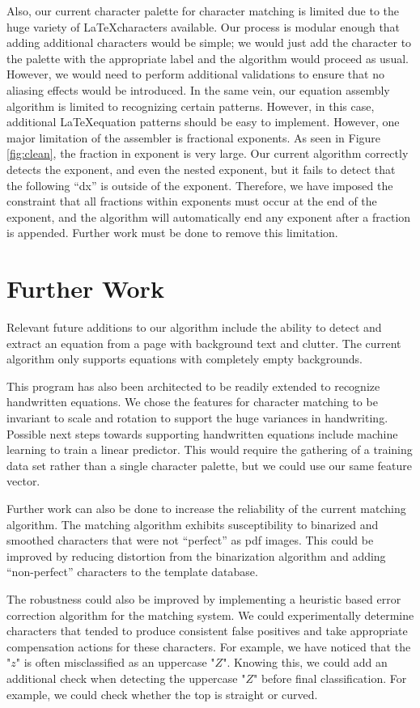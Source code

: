 \documentclass[journal]{IEEEtran}
\begin{document}
Also, our current character palette for character matching is limited due to the huge variety of \LaTeX characters available. Our process is modular enough that adding additional characters would be simple; we would just add the character to the palette with the appropriate label and the algorithm would proceed as usual. However, we would need to perform additional validations to ensure that no aliasing effects would be introduced. In the same vein, our equation assembly algorithm is limited to recognizing certain patterns. However, in this case, additional \LaTeX equation patterns should be easy to implement.
However, one major limitation of the assembler is fractional exponents. As seen in Figure \ref{fig:clean}, the fraction in exponent is very large. Our current algorithm correctly detects the exponent, and even the nested exponent, but it fails to detect that the following “dx” is outside of the exponent. Therefore, we have imposed the constraint that all fractions within exponents must occur at the end of the exponent, and the algorithm will automatically end any exponent after a fraction is appended. Further work must be done to remove this limitation.

\section{Further Work}
Relevant future additions to our algorithm include the ability to detect and extract an equation from a page with background text and clutter. The current algorithm only supports equations with completely empty backgrounds.

This program has also been architected to be readily extended to recognize handwritten equations. We chose the features for character matching to be invariant to scale and rotation to support the huge variances in handwriting. Possible next steps towards supporting handwritten equations include machine learning to train a linear predictor. This would require the gathering of a training data set rather than a single character palette, but we could use our same feature vector.

Further work can also be done to increase the reliability of the current matching algorithm. The matching algorithm exhibits susceptibility to binarized and smoothed characters that were not “perfect” as pdf images. This could be improved by reducing distortion from the binarization algorithm and adding “non-perfect” characters to the template database. 

The robustness could also be improved by implementing a heuristic based error correction algorithm for the matching system. We could experimentally determine characters that tended to produce consistent false positives and take appropriate compensation actions for these characters. For example, we have noticed that the "$z$"  is often misclassified as an uppercase "$Z$". Knowing this, we could add an additional check when detecting the uppercase "$Z$"  before final classification. For example, we could check whether the top is straight or curved.
\end{document}
